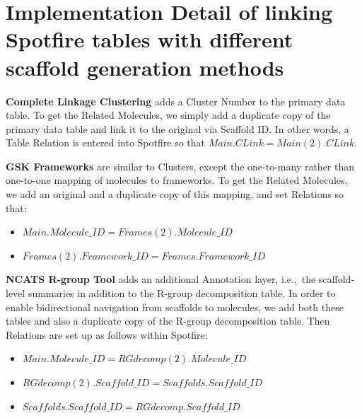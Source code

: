 \documentclass[11pt,letterpaper]{article}
\newcommand*\ie{i.e.,~}
\begin{document}
%



\newpage 

\section{Implementation Detail of linking Spotfire tables with different scaffold generation methods}
\label{sec:scaf-table-spotfire}

{\bf Complete Linkage Clustering} adds a Cluster Number to the primary data table. To get the Related Molecules, we simply add a duplicate copy of the primary data table and link it to the original via Scaffold ID. In other words, a Table Relation is entered into Spotfire so that $Main.CLink = Main(2).CLink$.  

{\bf GSK Frameworks} are similar to Clusters, except the one-to-many rather than one-to-one mapping of molecules to frameworks. To get the Related Molecules, we add an original and a duplicate copy of this mapping, and set Relations so that:  
\begin{itemize}
\item $Main.Molecule\_ID = Frames(2).Molecule\_ID$
\item $Frames(2).Framework\_ID = Frames.Framework\_ID$
\end{itemize}

{\bf NCATS R-group Tool} adds an additional Annotation layer, \ie the
scaffold-level summaries in addition to the R-group decomposition
table. In order to enable bidirectional navigation from scaffolds to
molecules, we add both these tables and also a duplicate copy of the
R-group decomposition table. Then Relations are set up as follows
within Spotfire:
\begin{itemize}
\item $Main.Molecule\_ID = RGdecomp(2).Molecule\_ID$
\item $RGdecomp(2).Scaffold\_ID = Scaffolds.Scaffold\_ID$
\item $Scaffolds.Scaffold\_ID = RGdecomp.Scaffold\_ID$
\end{itemize}   
\end{document}
